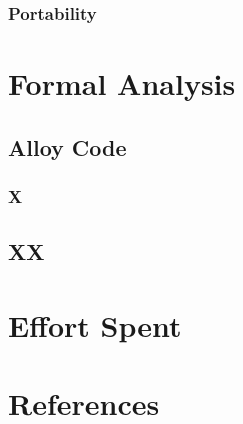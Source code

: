 \documentclass{article}
\begin{document}
\subsubsection{Portability}

\section{Formal Analysis}

\subsection{Alloy Code}

\subsubsection{X}

\subsection{XX}

\section{Effort Spent}

\section{References }








\end{document}

